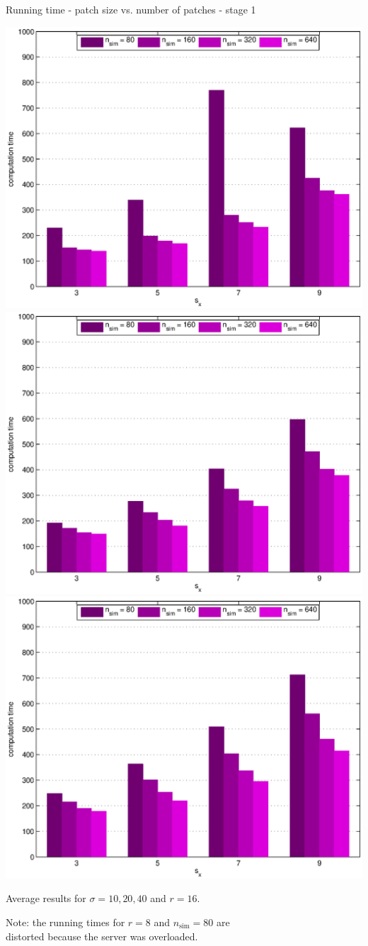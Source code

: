 \documentclass[mathserif, 8pt]{beamer}
\begin{document}
\begin{frame}{Running time - patch size vs. number of patches - stage 1}
	\begin{center}
		\includegraphics[width=.33\textwidth]{time_px1-np1-bars_1r16_s10_average.eps}%
		\includegraphics[width=.33\textwidth]{time_px1-np1-bars_1r16_s20_average.eps}%
		\includegraphics[width=.33\textwidth]{time_px1-np1-bars_1r16_s40_average.eps}
	\end{center}
	\begin{center}
	Average results for $\sigma = 10, 20, 40$ and $r = 16$.

	\bigskip

	Note: the running times for $r = 8$ and $n_{\text{sim}} = 80$ are \\
	distorted because the server was overloaded.
	\end{center}
\end{frame}
\end{document}
